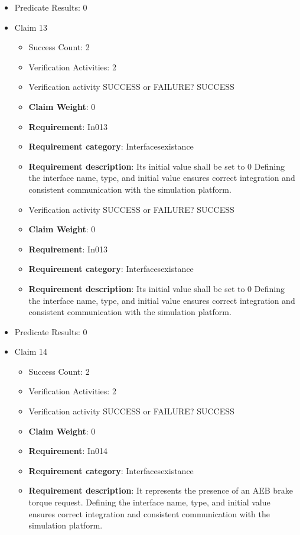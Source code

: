 \documentclass{article}
\begin{document}
\begin{itemize}
									    
				\item Predicate Results: 0

  				  \item Claim 13
				\begin{itemize}
			    	\item Success Count: 2 
			    	\item Verification Activities: 2
					\item Verification activity SUCCESS or FAILURE? SUCCESS
					\item \textbf{Claim Weight}: 0
						\item \textbf{Requirement}: In013 
						\item \textbf{Requirement category}: Interfacesexistance 
						\item \textbf{Requirement description}: Its initial value shall be set to 0 Defining the interface name, type, and initial value ensures correct integration and consistent communication with the simulation platform.
					
					\item Verification activity SUCCESS or FAILURE? SUCCESS
					\item \textbf{Claim Weight}: 0
						\item \textbf{Requirement}: In013 
						\item \textbf{Requirement category}: Interfacesexistance 
						\item \textbf{Requirement description}: Its initial value shall be set to 0 Defining the interface name, type, and initial value ensures correct integration and consistent communication with the simulation platform.
					
				\end{itemize}
				
									    
				\item Predicate Results: 0

  				  \item Claim 14
				\begin{itemize}
			    	\item Success Count: 2 
			    	\item Verification Activities: 2
					\item Verification activity SUCCESS or FAILURE? SUCCESS
					\item \textbf{Claim Weight}: 0
						\item \textbf{Requirement}: In014 
						\item \textbf{Requirement category}: Interfacesexistance 
						\item \textbf{Requirement description}: It represents the presence of an AEB brake torque request. Defining the interface name, type, and initial value ensures correct integration and consistent communication with the simulation platform.
					

\end{itemize}
\end{itemize}
\end{document}

